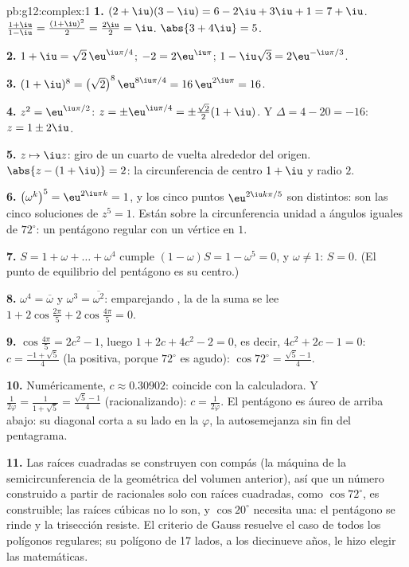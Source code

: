 \begin{solution}{pb:g12:complex:1}
\textbf{1.} $(2 + \iu)(3 - \iu) = 6 - 2\iu + 3\iu + 1 = 7 + \iu$. \quad
$\frac{1 + \iu}{1 - \iu} = \frac{(1 + \iu)^2}{2} = \frac{2\iu}{2} = \iu$.
\quad $\abs{3 + 4\iu} = 5$.

\textbf{2.} $1 + \iu = \sqrt2\,\eu^{\iu\pi/4}$; $-2 = 2\eu^{\iu\pi}$;
$1 - \iu\sqrt3 = 2\eu^{-\iu\pi/3}$.

\textbf{3.} $(1 + \iu)^8 = \left(\sqrt2\right)^8 \eu^{8\iu\pi/4} =
16\,\eu^{2\iu\pi} = 16$.

\textbf{4.} $z^2 = \eu^{\iu\pi/2}$:
$z = \pm\eu^{\iu\pi/4} = \pm\frac{\sqrt2}{2}(1 + \iu)$. Y
$\Delta = 4 - 20 = -16$: $z = 1 \pm 2\iu$.

\textbf{5.} $z \mapsto \iu z$: giro de un cuarto de vuelta alrededor del
origen. $\abs{z - (1 + \iu)} = 2$: la circunferencia de centro $1 + \iu$ y
radio $2$.

\textbf{6.} $\left(\omega^k\right)^5 = \eu^{2\iu\pi k} = 1$, y los cinco
puntos $\eu^{2\iu k\pi/5}$ son distintos: son las cinco soluciones de
$z^5 = 1$. Están sobre la circunferencia unidad a ángulos iguales de
$72^\circ$: un pentágono regular con un vértice en $1$.

\textbf{7.} $S = 1 + \omega + \dots + \omega^4$ cumple
$(1 - \omega)S = 1 - \omega^5 = 0$, y $\omega \neq 1$: $S = 0$. (El punto
de equilibrio del pentágono es su centro.)

\textbf{8.} $\omega^4 = \overline\omega$ y
$\omega^3 = \overline{\omega^2}$: emparejando , la  de
la suma se lee $1 + 2\cos\frac{2\pi}{5} + 2\cos\frac{4\pi}{5} = 0$.

\textbf{9.} $\cos\frac{4\pi}{5} = 2c^2 - 1$, luego
$1 + 2c + 4c^2 - 2 = 0$, es decir, $4c^2 + 2c - 1 = 0$:
$c = \frac{-1 + \sqrt5}{4}$ (la  positiva, porque $72^\circ$ es agudo):
$\cos 72^\circ = \frac{\sqrt5 - 1}{4}$.

\textbf{10.} Numéricamente, $c \approx 0.30902$: coincide con la
calculadora. Y $\frac{1}{2\varphi} = \frac{1}{1 + \sqrt5} =
\frac{\sqrt5 - 1}{4}$ (racionalizando): $c = \frac{1}{2\varphi}$. El
pentágono es áureo de arriba abajo: su diagonal corta a su lado en la 
$\varphi$, la autosemejanza sin fin del pentagrama.

\textbf{11.} Las raíces cuadradas se construyen con compás (la máquina de
la semicircunferencia de la  geométrica del volumen anterior), así que
un número construido a partir de racionales solo con raíces cuadradas,
como $\cos 72^\circ$, es construible; las raíces cúbicas no lo son, y
$\cos 20^\circ$ necesita una: el pentágono se rinde y la trisección
resiste. El criterio de Gauss resuelve el caso de todos los polígonos
regulares; su polígono de 17 lados, a los diecinueve años, le hizo elegir
las matemáticas.


\end{solution}
